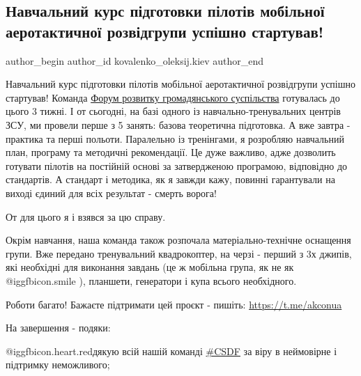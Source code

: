  
 
 
 
 
 
\subsection{Навчальний курс підготовки пілотів мобільної аеротактичної розвідгрупи успішно стартував!}
\label{sec:17_05_2022.fb.kovalenko_oleksij.kiev.1.kurs_piloty}
 
\ifcmt
 author_begin
   author_id kovalenko_oleksij.kiev
 author_end
\fi

Навчальний курс підготовки пілотів мобільної аеротактичної розвідгрупи успішно
стартував! Команда \href{https://www.facebook.com/csdf.ua}{Форум розвитку
громадянського суспільства} готувалась до цього 3 тижні. І от сьогодні, на базі
одного із навчально-тренувальних центрів ЗСУ, ми провели перше з 5 занять:
базова теоретична підготовка. А вже завтра - практика та перші польоти.
Паралельно із тренінгами, я розробляю навчальний план, програму та методичні
рекомендації. Це дуже важливо, адже дозволить готувати пілотів на постійній
основі за затвердженою програмою, відповідно до стандартів. А стандарт і
методика, як я завжди кажу, повинні гарантували на виході єдиний для всіх
результат - смерть ворога!

От для цього я і взявся за цю справу.

Окрім навчання, наша команда також розпочала матеріально-технічне оснащення
групи. Вже передано тренувальний квадрокоптер, на черзі - перший з 3х джипів,
які необхідні для виконання завдань (це ж мобільна група, як не як  @igg{fbicon.smile}  ),
планшети, генератори і купа всього необхідного.


Роботи багато! Бажаєте підтримати цей проєкт - пишіть: \url{https://t.me/akconua}

На завершення - подяки:

@igg{fbicon.heart.red}дякую всій нашій команді
\href{https://www.facebook.com/hashtag/csdf}{\#CSDF} за віру в неймовірне і
підтримку неможливого;

